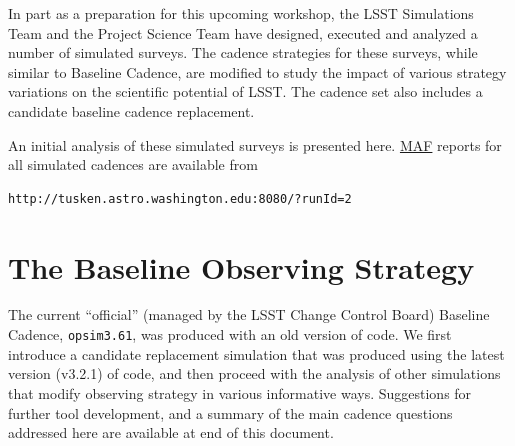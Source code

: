 In part as a preparation for this upcoming workshop, the LSST
Simulations Team and the Project Science Team have designed, executed
and analyzed a number of simulated surveys.  The cadence strategies
for these surveys, while similar to Baseline Cadence, are modified to
study the impact of various strategy variations on the scientific
potential of LSST. The cadence set also includes a candidate baseline
cadence replacement.

An initial analysis of these simulated surveys is presented here.
\href{https://confluence.lsstcorp.org/display/SIM/MAF+documentation}{MAF}
reports for all simulated cadences are available from \begin{verbatim}
http://tusken.astro.washington.edu:8080/?runId=2 \end{verbatim}

\listofopsimdbs

\navigationbar


\section{The Baseline Observing Strategy}
\def\secname{intro:baseline}\label{sec:\secname}

The current ``official'' (managed by the LSST Change Control Board)
Baseline Cadence, \texttt{opsim3.61},  was produced with an old version of
\OpSim code. We first introduce a candidate replacement simulation
that was produced using  the latest version (v3.2.1) of \OpSim code,
and then proceed with the analysis of other simulations that modify
observing strategy in various informative ways. Suggestions for
further tool development, and a summary of the main cadence questions
addressed  here are available at end of this document.



